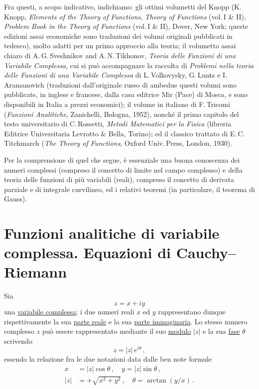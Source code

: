 \documentclass[11pt, a4paper]{book}
\numberwithin{equation}{section}
\begin{document}
Fra questi, a scopo indicativo, indichiamo: gli ottimi volumetti del Knopp (K.\,Knopp, \textit{Elements of the Theory of Functions}, \textit{Theory of Functions} (vol.\,I \& II), \textit{Problem Book in the Theory of Functions} (vol.\,I \& II), Dover, New York; queste edizioni assai economiche sono traduzioni dei volumi originali pubblicati in tedesco), molto adatti per un primo approccio alla teoria; il volumetto assai chiaro di A.\,G.\,Sveshnikov and A.\,N.\,Tikhonov, \textit{Teoria delle Funzioni di una Variabile Complessa}, cui si può accompagnare la raccolta di \textit{Problemi nella teoria delle Funzioni di una Variabile Complessa} di L.\,Volkovysky, G.\,Lunts e I.\,Aramanovich (traduzioni dall'originale russo di ambedue questi volumi sono pubblicate, in inglese e francese, dalla casa editrice Mir (Pace) di Mosca, e sono disponibili in Italia a prezzi economici); il volume in italiano di F.\,Tricomi (\textit{Funzioni Analitiche}, Zanichelli, Bologna, 1952), nonché il primo capitolo del testo universitario di C.\,Rossetti, \textit{Metodi Matematici per la Fisica} (libreria Editrice Universitaria Levrotto \& Bella, Torino); ed il classico trattato di E.\,C.\,Titchmarch (\textit{The Theory of Functions}, Oxford Univ.\,Press, London, 1930).

Per la comprensione di quel che segue, è essenziale una buona conoscenza dei numeri complessi (compreso il concetto di limite nel campo complesso) e della teoria delle funzioni di più variabili (reali), compreso il concetto di derivata parziale e di integrale curvilineo, ed i relativi teoremi (in particolare, il teorema di Gauss).


\section{Funzioni analitiche di variabile complessa. Equazioni di Cauchy--Riemann}

Sia
\begin{equation}
z = x + iy \tag{1a}
\end{equation}
una \uline{variabile complessa}; i due numeri reali $x$ ed $y$ rappresentano dunque rispettivamente la sua \uline{parte reale} e la sua \uline{parte immaginaria}. Lo stesso numero complesso $z$ può essere rappresentato mediante il suo \uline{modulo} $|z|$ e la sua \uline{fase} $\theta$ scrivendo
\begin{equation}
z = |z|\,e^{i\theta}\,, \tag{1b}
\end{equation}
essendo la relazione fra le due notazioni data dalle ben note formule
\begin{align}
x &= |z|\cos\theta\,, \quad y = |z|\sin\theta\,, \tag{2a}\\
|z| &= +\sqrt{x^2+y^2}\,, \quad \theta = \arctan(y/x)\,. \tag{2b}
\end{align}
\end{document}
